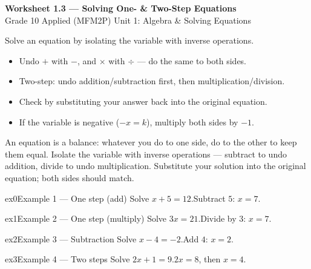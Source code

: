 \documentclass[11pt]{article}
\begin{document}
\begin{center}
{\LARGE\bfseries\color{titleblue}Worksheet 1.3 --- Solving One- \& Two-Step Equations}\\[2pt]
{\small Grade 10 Applied (MFM2P) \textperiodcentered{} Unit 1: Algebra \& Solving Equations}
\end{center}

\begin{ideabox}
Solve an equation by isolating the variable with inverse operations.
\begin{itemize}[leftmargin=*,itemsep=2pt]
  \item Undo $+$ with $-$, and $\times$ with $\div$ — do the same to both sides.
  \item Two-step: undo addition/subtraction first, then multiplication/division.
  \item Check by substituting your answer back into the original equation.
  \item If the variable is negative ($-x=k$), multiply both sides by $-1$.
\end{itemize}
\end{ideabox}

\begin{learnbox}
An equation is a balance: whatever you do to one side, do to the other to keep them equal.
Isolate the variable with inverse operations — subtract to undo addition, divide to undo multiplication.
Substitute your solution into the original equation; both sides should match.
\end{learnbox}


\begin{example}{ex0}{Example 1 --- One step (add)}
Solve $x+5=12$.\soln Subtract $5$: $x=7$.
\end{example}

\begin{example}{ex1}{Example 2 --- One step (multiply)}
Solve $3x=21$.\soln Divide by $3$: $x=7$.
\end{example}

\begin{example}{ex2}{Example 3 --- Subtraction}
Solve $x-4=-2$.\soln Add $4$: $x=2$.
\end{example}

\begin{example}{ex3}{Example 4 --- Two steps}
Solve $2x+1=9$.\soln $2x=8$, then $x=4$.
\end{example}
\end{document}
